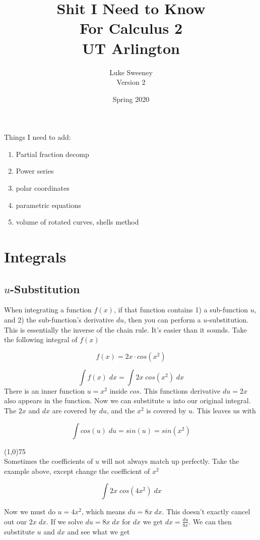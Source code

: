 \documentclass[12pt]{report}
\author{Luke Sweeney \\ \large Version 2}
\title{\textbf{Shit I Need to Know} \\ For Calculus 2 \\ UT Arlington}
\date{Spring 2020}
\begin{document}
\maketitle
\tableofcontents



Things I need to add:
\begin{enumerate}
	\item Partial fraction decomp
	\item Power series
	\item polar coordinates
	\item parametric equations
	\item volume of rotated curves, shells method
\end{enumerate}


\chapter{Integrals}


\section{$u$-Substitution}
When integrating a function $ f(x) $, if that function contains 1) a sub-function $ u $, and 2) the sub-function's derivative $ du $, then you can perform a $u$-substitution. This is essentially the inverse of the chain rule. It's easier than it sounds. Take the following integral of $ f(x) $

$$ f(x) = 2x \cdot cos(x^2) $$

$$
	\int f(x) \; dx = \int 2x \; cos(x^2) \; dx
$$
There is an inner function $ u = x^2 $ inside $ cos $. This functions derivative $ du = 2x $ also appears in the function. Now we can substitute $u$ into our original integral. The $ 2x $ and $ dx $ are covered by $ du $, and the $ x^2 $ is covered by $ u $. This leaves us with

$$ \int cos(u) \; du = sin(u) = sin(x^2)  $$

\line(1,0){75} \\

Sometimes the coefficients of $u$ will not always match up perfectly. Take the example above, except change the coefficient of $ x^2 $

$$ \int 2x \; cos(4x^2) \; dx $$

Now we must do $ u = 4x^2 $, which means $ du = 8x \; dx $. This doesn't exactly cancel out our $ 2x \; dx $. If we solve $ du = 8x \; dx $ for $ dx $ we get $ dx = \frac{du}{8x} $. We can then substitute $u$ and $dx$ and see what we get
\end{document}
